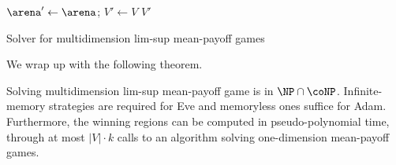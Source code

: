 \begin{algorithm}[thb]
 $\arena' \leftarrow \arena$; $V' \leftarrow V$\;
 \Return $V'$
 \caption{Solver for multidimension lim-sup mean-payoff games}
 \label{13-algo:MMP}
\end{algorithm}

We wrap up with the following theorem.
\begin{theorem}
\label{13-thm:MMPsup}
Solving multidimension lim-sup mean-payoff game is in $\NP \cap \coNP$. Infinite-memory strategies are required for Eve and memoryless ones suffice for Adam. Furthermore, the winning regions can be computed in pseudo-polynomial time, through at most $\vert V \vert \cdot k$ calls to an algorithm solving one-dimension mean-payoff games.
\end{theorem}

